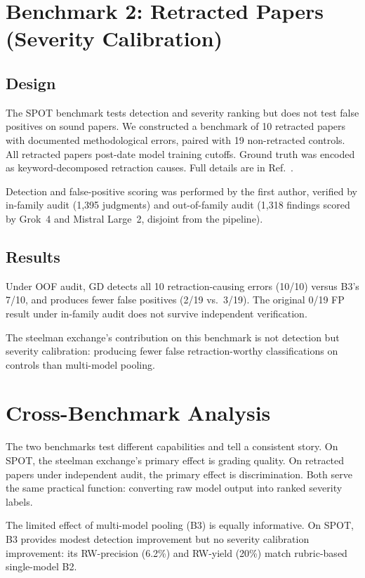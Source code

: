 \documentclass{ws-ijprai}
\begin{document}
\section{Benchmark 2: Retracted Papers (Severity Calibration)}
\label{sec:retracted_results}

\subsection{Design}

The SPOT benchmark tests detection and severity ranking but does not test
false positives on sound papers. We constructed a benchmark of 10 retracted
papers with documented methodological errors, paired with 19 non-retracted
controls. All retracted papers post-date model training cutoffs. Ground truth
was encoded as keyword-decomposed retraction causes. Full details are
in Ref.~.

Detection and false-positive scoring was performed by the first author,
verified by in-family audit (1,395 judgments) and out-of-family audit (1,318
findings scored by Grok~4 and Mistral Large~2, disjoint from the pipeline).

\subsection{Results}

Under OOF audit, GD detects all 10 retraction-causing errors (10/10) versus
B3's 7/10, and produces fewer false positives (2/19 vs.\ 3/19). The original
0/19 FP result under in-family audit does not survive independent verification.

The steelman exchange's contribution on this benchmark is not detection but
severity calibration: producing fewer false retraction-worthy classifications
on controls than multi-model pooling.


\section{Cross-Benchmark Analysis}

The two benchmarks test different capabilities and tell a consistent story.
On SPOT, the steelman exchange's primary effect is grading quality. On
retracted papers under independent audit, the primary effect is
discrimination. Both serve the same practical function: converting raw model
output into ranked severity labels.

The limited effect of multi-model pooling (B3) is equally informative. On
SPOT, B3 provides modest detection improvement but no severity calibration
improvement: its RW-precision (6.2\%) and RW-yield (20\%) match rubric-based
single-model B2.
\end{document}
